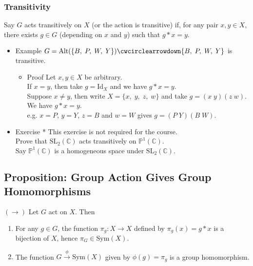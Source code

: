 \documentclass[11pt]{article}
\newcommand{\0}{\emptyset}
\newcommand{\C}{\mathbb{C}}
\begin{document}
\subsubsection*{Transitivity}
\label{sec:org4ac821e}
Say \(G\) acts transitively on \(X\) (or the action is transitive) if, for any pair \(x,y\in X\), there exists \(g\in G\) (depending on \(x\) and \(y\)) such that \(g*x=y\).\\[0pt]
\begin{itemize}
\item Example
\label{sec:orgcc63a5a}
\(G=\text{Alt}(\{B,\;P,\;W,\;Y\}) \cwcirclearrowdown \{B,\;P,\;W,\;Y\}\) is transitive.\\[0pt]
\begin{itemize}
\item Proof
\label{sec:orgba8d2c6}
Let \(x,y\in X\) be arbitrary.\\[0pt]
If \(x=y\), then take \(g=\text{Id}_{X}\) and we have \(g*x=y\).\\[0pt]
Suppose \(x\neq y\), then write \(X=\{x,\;y,\;z,\;w\}\) and take \(g=(x\;y)(z\;w)\). We have \(g*x=y\).\\[0pt]
e.g. \(x=P\), \(y=Y\), \(z=B\) and \(w=W\) gives \(g=(P\;Y)(B\;W)\).\\[0pt]
\end{itemize}
\item Exercise *
\label{sec:orga795118}
This exercise is not required for the course.\\[0pt]
Prove that \(\text{SL}_{2}(\C)\) acts transitively on \(\mathbb{P}^{1}(\C)\).\\[0pt]
Say \(\mathbb{P}^{1}(\C)\) is a homogeneous space under \(\text{SL}_{2}(\C)\).\\[0pt]
\end{itemize}
\subsection*{Proposition: Group Action Gives Group Homomorphisms}
\label{sec:orgdb00b9f}
\((\longrightarrow)\) Let \(G\) act on \(X\). Then\\[0pt]
\begin{enumerate}
\item For any \(g\in G\), the function \(\pi_{g}:X\to X\) defined by \(\pi_{g}(x)=g*x\) is a bijection of \(X\), hence \(\pi_{G}\in\text{Sym}(X)\).\\[0pt]
\item The function \(G\overset{\phi}{\to}\text{Sym}(X)\) given by \(\phi(g)=\pi_{g}\) is a group homomorphism.\\[0pt]
\end{enumerate}
\end{document}
